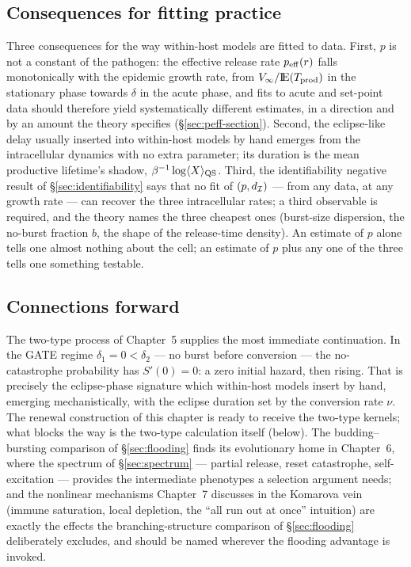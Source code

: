 \subsection{Consequences for fitting practice}

Three consequences for the way within-host models are fitted to data.
First, $p$ is not a constant of the pathogen: the effective release rate
$p_{\rm eff}(r)$ falls monotonically with the epidemic growth rate, from
$V_\infty/{\rm I}\!{\rm E}(T_{\rm prod})$ in the stationary phase towards $\delta$ in
the acute phase, and fits to acute and set-point data should therefore
yield systematically different estimates, in a direction and by an amount
the theory specifies (\S\ref{sec:peff-section}). Second, the eclipse-like
delay usually inserted into within-host models by hand emerges from the
intracellular dynamics with no extra parameter; its duration is the mean
productive lifetime's shadow, $\beta^{-1}\log\langle X\rangle_{\rm QS}$.
Third, the identifiability negative result of
\S\ref{sec:identifiability} says that no fit of $(p,d_{\mathcal{I}})$ --- from
any data, at any growth rate --- can recover the three intracellular rates;
a third observable is required, and the theory names the three cheapest
ones (burst-size dispersion, the no-burst fraction $b$, the shape of the
release-time density). An estimate of $p$ alone tells one almost nothing
about the cell; an estimate of $p$ plus any one of the three tells one
something testable.

\subsection{Connections forward}

The two-type process of Chapter~5 supplies the most immediate continuation.
In the GATE regime $\delta_1=0<\delta_2$ --- no burst before conversion ---
the no-catastrophe probability has $S'(0)=0$: a zero initial hazard, then
rising. That is precisely the eclipse-phase signature which within-host
models insert by hand, emerging mechanistically, with the eclipse duration
set by the conversion rate $\nu$. The renewal construction of this chapter
is ready to receive the two-type kernels; what blocks the way is the
two-type calculation itself (below). The budding--bursting comparison of
\S\ref{sec:flooding} finds its evolutionary home in Chapter~6, where the
spectrum of \S\ref{sec:spectrum} --- partial release, reset catastrophe,
self-excitation --- provides the intermediate phenotypes a selection
argument needs; and the nonlinear mechanisms Chapter~7 discusses in the
Komarova vein (immune saturation, local depletion, the ``all run out at
once'' intuition) are exactly the effects the branching-structure
comparison of \S\ref{sec:flooding} deliberately excludes, and should be
named wherever the flooding advantage is invoked.

